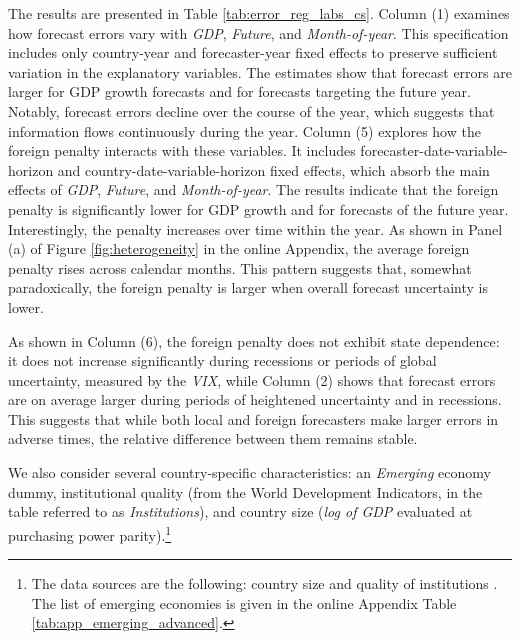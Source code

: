 The results are presented in Table \ref{tab:error_reg_labs_cs}. Column (1) examines how forecast errors vary with \textit{GDP}, \textit{Future}, and \textit{Month-of-year}. This specification includes only country-year and forecaster-year fixed effects to preserve sufficient variation in the explanatory variables. The estimates show that forecast errors are larger for GDP growth forecasts and for forecasts targeting the future year. Notably, forecast errors decline over the course of the year, which suggests that information flows continuously during the year. Column (5) explores how the foreign penalty interacts with these variables. It includes forecaster-date-variable-horizon and country-date-variable-horizon fixed effects, which absorb the main effects of \textit{GDP}, \textit{Future}, and \textit{Month-of-year}. The results indicate that the foreign penalty is significantly lower for GDP growth and for forecasts of the future year. Interestingly, the penalty increases over time within the year. As shown in Panel (a) of Figure \ref{fig:heterogeneity} in the online Appendix, the average foreign penalty rises across calendar months. This pattern suggests that, somewhat paradoxically, the foreign penalty is larger when overall forecast uncertainty is lower.


As shown in Column (6), the foreign penalty does not exhibit state dependence: it does not increase significantly during recessions or periods of global uncertainty, measured by the \textit{VIX}, while Column (2) shows that forecast errors are on average larger during periods of heightened uncertainty and in recessions. This suggests that while both local and foreign forecasters make larger errors in adverse times, the relative difference between them remains stable.

We also consider several country-specific characteristics: an \textit{Emerging} economy dummy, institutional quality (from the World Development Indicators, in the table referred to as \textit{Institutions}), and country size (\textit{log of GDP }evaluated at purchasing power parity).\footnote{The data sources are the following: country size \citep{cpigravity22} and quality of institutions \citep{wdi22}. The list of emerging economies is given in the online Appendix Table \ref{tab:app_emerging_advanced}.}



